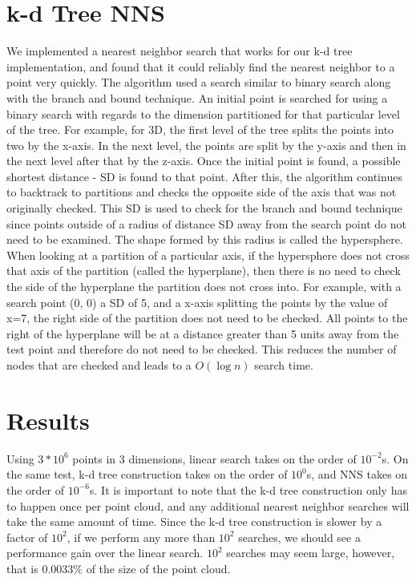\documentclass[a4paper,12pt,twocolumn]{article}
\begin{document}
\section{k-d Tree NNS}
We implemented a nearest neighbor search that works for our k-d tree implementation,
and found that it could reliably find the nearest neighbor to a point very quickly.
The algorithm used a search similar to binary search along with the branch and bound
technique. An initial point is searched for using a binary search with regards to the
dimension partitioned for that particular level of the tree. For example, for 3D,
the first level of the tree splits the points into two by the x-axis. In the next level,
the points are split by the y-axis and then in the next level after that by the z-axis.
Once the initial point is found, a possible shortest distance - SD is found to that point.
After this, the algorithm continues to backtrack to partitions and checks the opposite
side of the axis that was not originally checked. This SD is used to check for the branch
and bound technique since points outside of a radius of distance SD away from the search
point do not need to be examined. The shape formed by this radius is called the hypersphere.
When looking at a partition of a particular axis, if the hypersphere does not cross that
axis of the partition (called the hyperplane), then there is no need to check the side of
the hyperplane the partition does not cross into. For example, with a search point (0, 0) a
SD of 5, and a x-axis splitting the points by the value of x=7, the right side of the partition
does not need to be checked. All points to the right of the hyperplane will be at a distance
greater than 5 units away from the test point and therefore do not need to be checked.
This reduces the number of nodes that are checked and leads to a $O(\log n)$ search time.

\section{Results}
Using $3*10^6$ points in 3 dimensions, linear search takes on the order of $10^{-2}$s.
On the same test, k-d tree construction takes on the order of $10^0$s, and NNS takes
on the order of $10^{-6}$s.
It is important to note that the k-d tree construction only has to happen once per point
cloud, and any additional nearest neighbor searches will take the same amount of time.
Since the k-d tree construction is slower by a factor of $10^2$, if we perform any more
than $10^2$ searches, we should see a performance gain over the linear search.
$10^2$ searches may seem large, however, that is $0.0033\%$ of the size of the point cloud.
\end{document}
